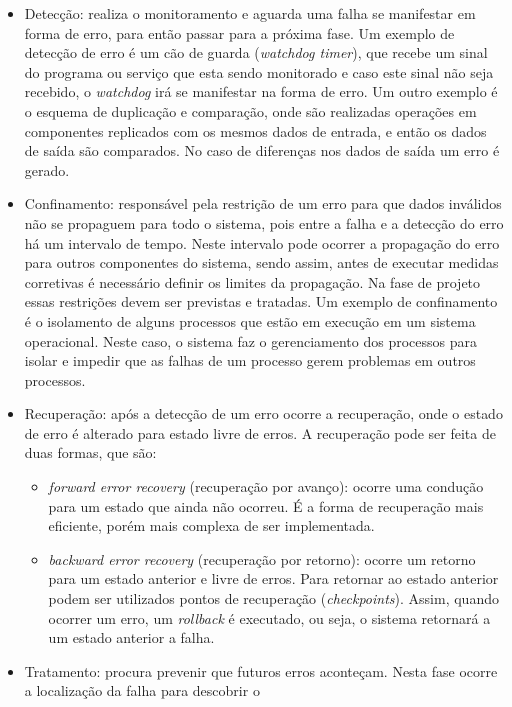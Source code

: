 \begin{itemize}
 \item Detecção: realiza o monitoramento e aguarda uma falha se manifestar em forma de erro, para então passar para a próxima fase. 
 Um exemplo de detecção de erro é um cão de guarda (\textit{watchdog timer}), que recebe um sinal do programa ou serviço que esta sendo 
 monitorado e caso este sinal não seja recebido, o \textit{watchdog} irá se manifestar na forma de erro. 
 Um outro exemplo é o esquema de duplicação e comparação, onde são realizadas operações em componentes replicados com os mesmos dados de 
 entrada, e então os dados de saída são comparados. No caso de diferenças nos dados de saída um erro é gerado.
 \item Confinamento: responsável pela restrição de um erro para que dados inválidos não se propaguem para todo o sistema, pois entre a falha e a
 detecção do erro há um intervalo de tempo. Neste intervalo pode ocorrer a propagação do erro para outros componentes do sistema, sendo assim, 
 antes de executar medidas corretivas é necessário definir os limites da propagação. Na fase de projeto essas restrições devem ser previstas
 e tratadas. Um exemplo de confinamento é o isolamento de alguns processos que estão em execução em um sistema operacional. Neste caso, o 
 sistema faz o gerenciamento dos processos para isolar e impedir que as falhas de um processo gerem problemas em outros processos.
 \item Recuperação: após a detecção de um erro ocorre a recuperação, onde o estado de erro é alterado para estado livre de erros. A recuperação
 pode ser feita de duas formas, que são:
 \begin{itemize}
  \item \textit{forward error recovery} (recuperação por avanço): ocorre uma condução para um estado que ainda não ocorreu. É a forma
  de recuperação mais eficiente, porém mais complexa de ser implementada.
  \item \textit{backward error recovery} (recuperação por retorno): ocorre um retorno para um estado anterior e livre de erros.
  Para retornar ao estado anterior podem ser utilizados pontos de recuperação (\textit{checkpoints}). Assim, quando ocorrer um erro, um 
  \textit{rollback} é executado, ou seja, o sistema retornará a um estado anterior a falha.
 \end{itemize}
 \item Tratamento: procura prevenir que futuros erros aconteçam. Nesta fase ocorre a localização da falha para descobrir o 

\end{itemize}

